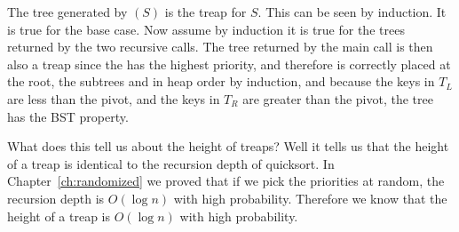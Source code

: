 The tree generated by $(S)$ is the treap for $S$.  This
can be seen by induction.  It is true for the base case.  Now assume
by induction it is true for the trees returned by the two recursive
calls.  The tree returned by the main call is then also a treap since
the  has the highest priority, and therefore is correctly
placed at the root, the subtrees and in heap order by induction, and
because the keys in $T_L$ are less than the pivot, and the keys in
$T_R$ are greater than the pivot, the tree has the BST property.

What does this tell us about the height of treaps?  Well it tells us
that the height of a treap is identical to the recursion depth of
quicksort.  In Chapter~\ref{ch:randomized} we proved that if we pick
the priorities at random, the recursion depth is $O(\log n)$ with high
probability.  Therefore we know that the height of a treap is $O(\log
n)$ with high probability.

